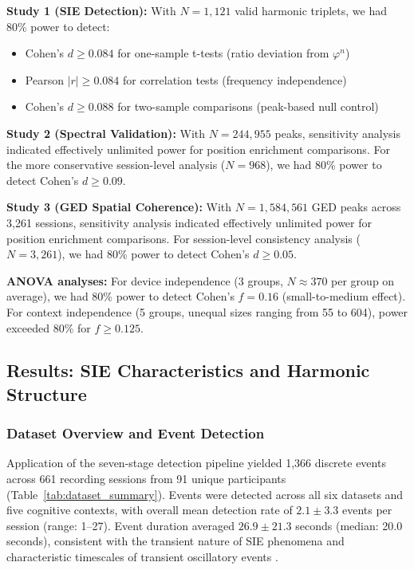 \documentclass[11pt,a4paper]{article}
\newcommand{\phisym}{\varphi}
\begin{document}
\textbf{Study 1 (SIE Detection):} With $N = 1,121$ valid harmonic triplets, we had 80\% power to detect:
\begin{itemize}
    \item Cohen's $d \geq 0.084$ for one-sample t-tests (ratio deviation from $\phisym^n$)
    \item Pearson $|r| \geq 0.084$ for correlation tests (frequency independence)
    \item Cohen's $d \geq 0.088$ for two-sample comparisons (peak-based null control)
\end{itemize}

\textbf{Study 2 (Spectral Validation):} With $N = 244,955$ peaks, sensitivity analysis indicated effectively unlimited power for position enrichment comparisons. For the more conservative session-level analysis ($N = 968$), we had 80\% power to detect Cohen's $d \geq 0.09$.

\textbf{Study 3 (GED Spatial Coherence):} With $N = 1,584,561$ GED peaks across 3,261 sessions, sensitivity analysis indicated effectively unlimited power for position enrichment comparisons. For session-level consistency analysis ($N = 3,261$), we had 80\% power to detect Cohen's $d \geq 0.05$.

\textbf{ANOVA analyses:} For device independence (3 groups, $N \approx 370$ per group on average), we had 80\% power to detect Cohen's $f = 0.16$ (small-to-medium effect). For context independence (5 groups, unequal sizes ranging from 55 to 604), power exceeded 80\% for $f \geq 0.125$.

\subsection{Results: SIE Characteristics and Harmonic Structure}

\subsubsection{Dataset Overview and Event Detection}
Application of the seven-stage detection pipeline yielded 1,366 discrete events across 661 recording sessions from 91 unique participants (Table~\ref{tab:dataset_summary}). Events were detected across all six datasets and five cognitive contexts, with overall mean detection rate of $2.1 \pm 3.3$ events per session (range: 1--27). Event duration averaged $26.9 \pm 21.3$ seconds (median: 20.0 seconds), consistent with the transient nature of SIE phenomena and characteristic timescales of transient oscillatory events \parencite{siegel2012spectral}.
\end{document}

